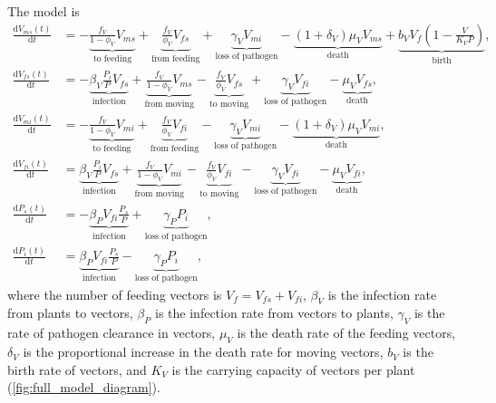 \documentclass{article}
\newcommand{\md}{\mathrm{d}}
\begin{document}
The model is
\begin{equation}
  \label{odesystem}
  \begin{split}
    \frac{\md V_{ms}(t)}{\md t}
    &=
    - \underbrace{\frac{f_V}{1 - \phi_V} V_{ms}}_\text{to feeding}
    + \underbrace{\frac{f_V}{\phi_V}  V_{fs}}_\text{from feeding}
    + \underbrace{\gamma_V V_{mi}}_\text{loss of pathogen}
    - \underbrace{(1 + \delta_V) \mu_V V_{ms}}_\text{death}
    + \underbrace{b_V V_f \left(1 - \frac{V}{K_V P}\right)}_\text{birth},
    \\
    \frac{\md V_{fs}(t)}{\md t}
    &=
    - \underbrace{\beta_V \frac{P_i}{P} V_{fs}}_\text{infection}
    + \underbrace{\frac{f_V}{1 - \phi_V} V_{ms}}_\text{from moving}
    - \underbrace{\frac{f_V}{\phi_V} V_{fs}}_\text{to moving}
    + \underbrace{\gamma_V V_{fi}}_\text{loss of pathogen}
    - \underbrace{\mu_V V_{fs}}_\text{death},
    \\
    \frac{\md V_{mi}(t)}{\md t}
    &=
    - \underbrace{\frac{f_V}{1 - \phi_V} V_{mi}}_\text{to feeding}
    + \underbrace{\frac{f_V}{\phi_V} V_{fi}}_\text{from feeding}
    - \underbrace{\gamma_V V_{mi}}_\text{loss of pathogen}
    - \underbrace{(1 + \delta_V) \mu_V V_{mi}}_\text{death},
    \\
    \frac{\md V_{fi}(t)}{\md t}
    &=
    \underbrace{\beta_V \frac{P_i}{P} V_{fs}}_\text{infection}
    + \underbrace{\frac{f_V}{1 - \phi_V} V_{mi}}_\text{from moving}
    - \underbrace{\frac{f_V}{\phi_V} V_{fi}}_\text{to moving}
    - \underbrace{\gamma_V V_{fi}}_\text{loss of pathogen}
    - \underbrace{\mu_V V_{fi}}_\text{death},
    \\
    \frac{\md P_s(t)}{\md t}
    &=
    - \underbrace{\beta_P V_{fi} \frac{P_s}{P}}_\text{infection}
    +\underbrace{\gamma_P P_i}_\text{loss of pathogen},
    \\
   \frac{\md P_i(t)}{\md t}
    &=
    \underbrace{\beta_P V_{fi} \frac{P_s}{P}}_\text{infection}
    - \underbrace{\gamma_P P_i}_\text{loss of pathogen},
  \end{split}
\end{equation}
where the number of feeding vectors is $V_f = V_{fs} + V_{fi}$,
$\beta_V$ is the infection rate from plants to vectors, $\beta_P$ is
the infection rate from vectors to plants, $\gamma_V$ is the rate of
pathogen clearance in vectors, $\mu_V$ is the death rate of the
feeding vectors, $\delta_V$ is the proportional increase in the death
rate for moving vectors, $b_V$ is the birth rate of vectors, and $K_V$
is the carrying capacity of vectors per plant
(\autoref{fig:full_model_diagram}).
\end{document}
